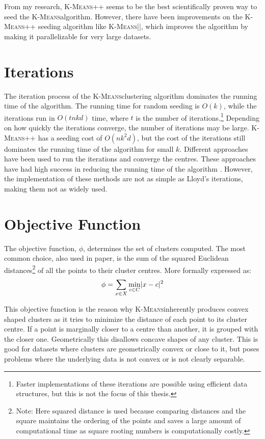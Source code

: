 \documentclass[12pt]{dalthesis}
\newcommand*{\kmeansn}{\textsc{K-Means}} %
\newcommand*{\kmeans}{\kmeansn } %
\DeclarePairedDelimiter\abs{\lvert}{\rvert}
\begin{document}
From my research, \kmeansn++ seems to be the best scientifically proven way to seed the \kmeans algorithm. However, there have been improvements on the \kmeansn++ seeding algorithm like \kmeansn||, which improves the algorithm by making it parallelizable for very large datasets. 


\section{Iterations}

The iteration process of the \kmeans clustering algorithm dominates the running time of the algorithm. The running time for random seeding is $O(k)$, while the iterations run in $O(tnkd)$ time, where $t$ is the number of iterations.\footnote{Faster implementations of these iterations are possible using efficient data structures, but this is not the focus of this thesis.} Depending on how quickly the iterations converge, the number of iterations may be large. \kmeansn++ has a seeding cost of $O(nk^2d)$, but the cost of the iterations still dominates the running time of the algorithm for small $k$.
Different approaches have been used to run the iterations and converge the centres. These approaches have had high success in reducing the running time of the algorithm \cite{alsabti1997efficient}. However, the implementation of these methods are not as simple as Lloyd's iterations, making them not as widely used. 

\section{Objective Function}
The objective function, $\phi$, determines the set of clusters computed. The most common choice, also used in paper, is the sum of the squared Euclidean distances\footnote{Note: Here squared distance is used because comparing distances and the square maintains the ordering of the points and saves a large amount of computational time as square rooting numbers is computationally costly.}
of all the points to their cluster centres. More formally expressed as:
$$\phi = \sum_{x\in X} \min_{c\in C}\abs{ x-c}^2$$

This objective function is the reason why \kmeans inherently produces convex shaped clusters as it tries to minimize the distance of each point to its cluster centre. If a point is marginally closer to a centre than another, it is grouped with the closer one. Geometrically this disallows concave shapes of any cluster. This is good for datasets where clusters are geometrically convex or close to it, but poses problems where the underlying data is not convex or is not clearly separable.
\end{document}
